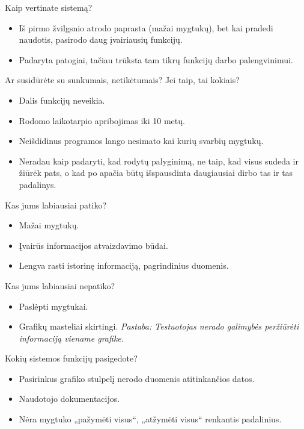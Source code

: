 Kaip vertinate sistemą?
\begin{itemize}
  \item Iš pirmo žvilgsnio atrodo paprasta (mažai mygtukų), bet
    kai pradedi naudotis, pasirodo daug įvairiausių funkcijų.
  \item Padaryta patogiai, tačiau trūksta tam tikrų funkcijų darbo
    palengvinimui.
\end{itemize}

Ar susidūrėte su sunkumais, netikėtumais? Jei taip, tai kokiais?
\begin{itemize}
  \item Dalis funkcijų neveikia.
  \item Rodomo laikotarpio apribojimas iki 10 metų.
  \item Neišdidinus programos lango nesimato kai kurių svarbių mygtukų.
  \item Neradau kaip padaryti, kad rodytų palyginimą, ne taip, kad visus
    sudeda ir žiūrėk pats, o kad po apačia būtų išspausdinta daugiausiai
    dirbo tas ir tas padalinys.
\end{itemize}

Kas jums labiausiai patiko?
\begin{itemize}
  \item Mažai mygtukų.
  \item Įvairūs informacijos atvaizdavimo būdai.
  \item Lengva rasti istorinę informaciją, pagrindinius duomenis.
\end{itemize}

Kas jums labiausiai nepatiko?
\begin{itemize}
  \item Paslėpti mygtukai.
  \item Grafikų masteliai skirtingi. \emph{Pastaba: Testuotojas
    nerado galimybės peržiūrėti informaciją viename grafike.}
\end{itemize}

Kokių sistemos funkcijų pasigedote?
\begin{itemize}
  \item Pasirinkus grafiko stulpelį nerodo duomenis atitinkančios datos.
  \item Naudotojo dokumentacijos.
  \item Nėra mygtuko „pažymėti visus“, „atžymėti visus“ renkantis
    padalinius.
\end{itemize}
